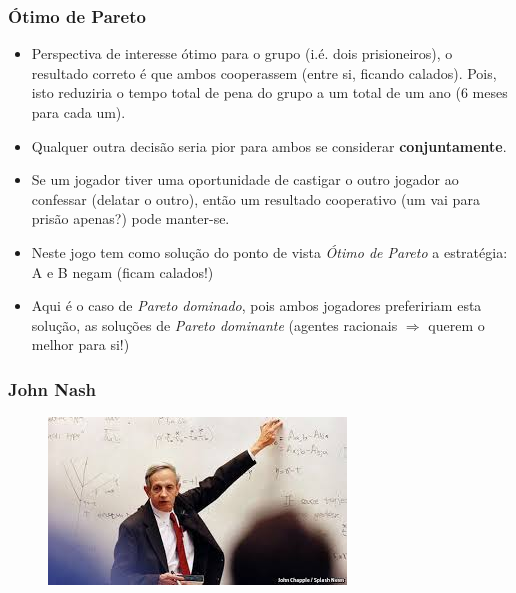 

\begin{frame}
    \frametitle{Ótimo de Pareto}

 \begin{itemize}
  
 
   \item Perspectiva de interesse ótimo para o grupo (i.é. dois prisioneiros), o resultado correto é que  ambos cooperassem (entre si, ficando calados).   Pois,  isto reduziria o tempo total de pena do grupo a um total de um ano (6 meses para cada um).

   \item  Qualquer outra decisão seria pior para ambos se considerar \textbf{conjuntamente}.

\item Se um jogador tiver uma oportunidade de castigar o outro jogador ao confessar (delatar o outro), então um resultado cooperativo (um vai para prisão apenas?) pode manter-se.

\pause
   
   
\item Neste jogo tem como solução do ponto de vista \textit{Ótimo de Pareto} a estratégia: A e B negam (ficam calados!)

\item Aqui  é o caso de \textit{Pareto dominado}, pois ambos jogadores prefeririam esta solução, as soluções de \textit{Pareto dominante} (agentes racionais $\Rightarrow $ querem o melhor para si!)
     
 \end{itemize}
 
 
\end{frame}
 
 
\begin{frame}
    \frametitle{John Nash}
 
     
\begin{figure}[!ht]
\centering
\includegraphics[height =.6\textheight, width=.7\textwidth]{figuras/john_nash01.jpg}
\end{figure}

\end{frame}

